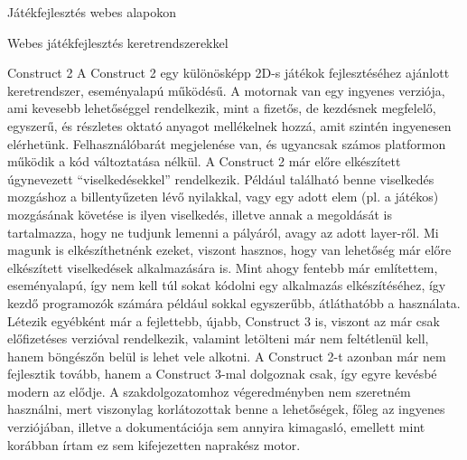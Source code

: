 \begin{MyChapter}{Játékfejlesztés webes alapokon}
\begin{MySection}{Webes játékfejlesztés keretrendszerekkel}
		\begin{MySubSection}{Construct 2}
			A Construct 2 egy különösképp 2D-s játékok fejlesztéséhez ajánlott keretrendszer, eseményalapú működésű. A motornak van egy ingyenes verziója, ami kevesebb lehetőséggel rendelkezik, mint a fizetős, de kezdésnek megfelelő, egyszerű, és részletes oktató anyagot mellékelnek hozzá, amit szintén ingyenesen elérhetünk. Felhasználóbarát megjelenése van, és ugyancsak számos platformon működik a kód változtatása nélkül.
			A Construct 2 már előre elkészített úgynevezett ``viselkedésekkel'' rendelkezik. Például található benne viselkedés mozgáshoz a billentyűzeten lévő nyilakkal, vagy egy adott elem (pl. a játékos) mozgásának követése is ilyen viselkedés, illetve annak a megoldását is tartalmazza, hogy ne tudjunk lemenni a pályáról, avagy az adott layer-ről. Mi magunk is elkészíthetnénk ezeket, viszont hasznos, hogy van lehetőség már előre elkészített viselkedések alkalmazására is.
			Mint ahogy fentebb már említettem, eseményalapú, így nem kell túl sokat kódolni egy alkalmazás elkészítéséhez, így kezdő programozók számára például sokkal egyszerűbb, átláthatóbb a használata.
			Létezik egyébként már a fejlettebb, újabb, Construct 3 is, viszont az már csak előfizetéses verzióval rendelkezik, valamint letölteni már nem feltétlenül kell, hanem böngészőn belül is lehet vele alkotni.
			A Construct 2-t azonban már nem fejlesztik tovább, hanem a Construct 3-mal dolgoznak csak, így egyre kevésbé modern az elődje.
			A szakdolgozatomhoz végeredményben nem szeretném használni, mert viszonylag korlátozottak benne a lehetőségek, főleg az ingyenes verziójában, illetve a dokumentációja sem annyira kimagasló, emellett mint korábban írtam ez sem kifejezetten naprakész motor.
			\cite{construct_2_manual}
			\cite{construct_2_javascript_sdk}
		\end{MySubSection}
			

\end{MySection}
\end{MyChapter}

